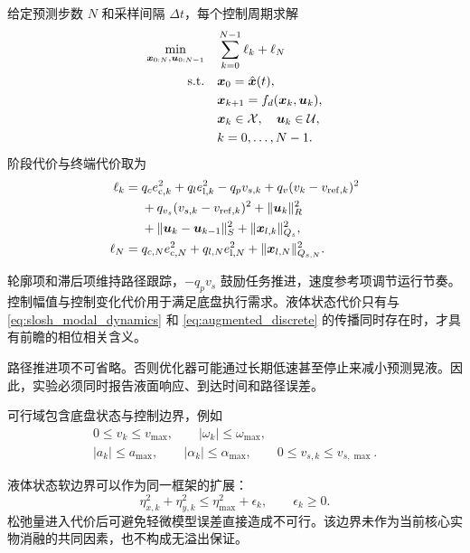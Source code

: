 给定预测步数 $N$ 和采样间隔 $\Delta t$，每个控制周期求解
\begin{equation}
\begin{aligned}
  \min_{\bm{x}_{0:N},\bm{u}_{0:N-1}}\quad
  &\sum_{k=0}^{N-1}\ell_k+\ell_N\\
  \mathrm{s.t.}\quad
  &\bm{x}_0=\hat{\bm{x}}(t),\\
  &\bm{x}_{k+1}=f_d(\bm{x}_k,\bm{u}_k),\\
  &\bm{x}_k\in\mathcal{X},\quad \bm{u}_k\in\mathcal{U},\\
  &k=0,\ldots,N-1 .
\end{aligned}
\label{eq:spmpc_ocp}
\end{equation}
阶段代价与终端代价取为
\begin{equation}
\begin{aligned}
  \ell_k={}&
    q_c e_{\mathrm{c},k}^{2}
    +q_l e_{\mathrm{l},k}^{2}
    -q_p v_{s,k}
    +q_v(v_k-v_{\mathrm{ref},k})^2\\
  &+q_{v_s}(v_{s,k}-v_{\mathrm{ref},k})^2
    +\|\bm{u}_k\|_{R}^{2}\\
  &+\|\bm{u}_k-\bm{u}_{k-1}\|_{S}^{2}
    +\|\bm{x}_{l,k}\|_{Q_s}^{2},\\
  \ell_N={}&
    q_{c,N}e_{\mathrm{c},N}^{2}
    +q_{l,N}e_{\mathrm{l},N}^{2}
    +\|\bm{x}_{l,N}\|_{Q_{s,N}}^{2}.
\end{aligned}
\label{eq:spmpc_cost_terms}
\end{equation}

轮廓项和滞后项维持路径跟踪，$-q_pv_s$ 鼓励任务推进，速度参考项调节运行节奏。控制幅值与控制变化代价用于满足底盘执行需求。液体状态代价只有与 \cref{eq:slosh_modal_dynamics} 和 \cref{eq:augmented_discrete} 的传播同时存在时，才具有前瞻的相位相关含义。

路径推进项不可省略。否则优化器可能通过长期低速甚至停止来减小预测晃液。因此，实验必须同时报告液面响应、到达时间和路径误差。

可行域包含底盘状态与控制边界，例如
\begin{equation}
\begin{gathered}
  0\leq v_k\leq v_{\max},\qquad
  |\omega_k|\leq\omega_{\max},\\
  |a_k|\leq a_{\max},\qquad
  |\alpha_k|\leq\alpha_{\max},\qquad
  0\leq v_{s,k}\leq v_{s,\max}.
\end{gathered}
\label{eq:spmpc_bounds}
\end{equation}

液体状态软边界可以作为同一框架的扩展：
\begin{equation}
  \eta_{x,k}^{2}+\eta_{y,k}^{2}
  \leq \eta_{\max}^{2}+\epsilon_k,\qquad \epsilon_k\geq0.
  \label{eq:slosh_soft_bound}
\end{equation}
松弛量进入代价后可避免轻微模型误差直接造成不可行。该边界未作为当前核心实物消融的共同因素，也不构成无溢出保证。


